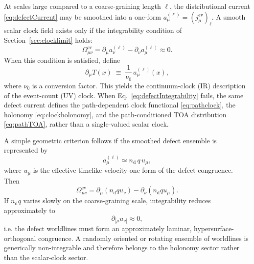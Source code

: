 \documentclass[pdflatex,sn-mathphys-num]{sn-jnl}
\theoremstyle{thmstylethree}
\theoremstyle{thmstyleone}
\theoremstyle{thmstyletwo}
\numberwithin{equation}{section}
\begin{document}
        At scales large compared to a coarse-graining length $\ell$, the distributional current \eqref{eq:defectCurrent} may be smoothed into a one-form $a^{(\ell)}_\mu=(j^{\mathrm{ev}}_\mu)_\ell$. A smooth scalar clock field exists only if the integrability condition of Section~\ref{sec:clocklimit} holds:
        \begin{equation}
            \Omega^{\mathrm{ev}}_{\mu\nu}
            =
            \partial_\mu a^{(\ell)}_\nu-\partial_\nu a^{(\ell)}_\mu
            \approx 0 .
            \label{eq:defectIntegrability}
        \end{equation}
        When this condition is satisfied, define
        \begin{equation}
            \partial_\mu T(x)
            \;\equiv\;
            \frac{1}{\nu_0}\,a^{(\ell)}_\mu(x),
            \label{eq:TFromEvents}
        \end{equation}
        where $\nu_0$ is a conversion factor. This yields the continuum-clock (IR) description of the event-count (UV) clock. When Eq.~\eqref{eq:defectIntegrability} fails, the same defect current defines the path-dependent clock functional \eqref{eq:pathclock}, the holonomy \eqref{eq:clockholonomy}, and the path-conditioned TOA distribution \eqref{eq:pathTOA}, rather than a single-valued scalar clock.

        A simple geometric criterion follows if the smoothed defect ensemble is represented by
        \begin{equation}
            a^{(\ell)}_\mu \simeq n_{\mathrm d}\,q\,u_\mu,
            \label{eq:defectLaminarAnsatz}
        \end{equation}
        where $u_\mu$ is the effective timelike velocity one-form of the defect congruence. Then
        \begin{equation}
            \Omega^{\mathrm{ev}}_{\mu\nu}
            =
            \partial_\mu(n_{\mathrm d}q u_\nu)
            -
            \partial_\nu(n_{\mathrm d}q u_\mu).
            \label{eq:defectOmega}
        \end{equation}
        If $n_{\mathrm d}q$ varies slowly on the coarse-graining scale, integrability reduces approximately to
        \begin{equation}
            \partial_{[\mu}u_{\nu]}\approx0,
            \label{eq:defectHypersurfaceOrthogonal}
        \end{equation}
        i.e. the defect worldlines must form an approximately laminar, hypersurface-orthogonal congruence. A randomly oriented or rotating ensemble of worldlines is generically non-integrable and therefore belongs to the holonomy sector rather than the scalar-clock sector.
    
\end{document}
